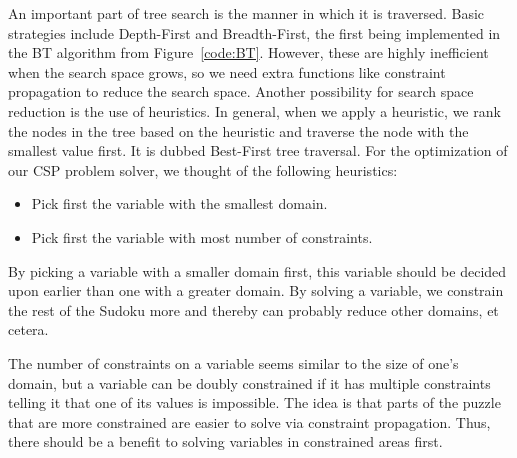 \documentclass[11pt]{article} %
\begin{document}
An important part of tree search is the manner in which it is traversed. Basic strategies include Depth-First and Breadth-First, the first being implemented in the BT algorithm from Figure~\ref{code:BT}. However, these are highly inefficient when the search space grows, so we need extra functions like constraint propagation to reduce the search space. Another possibility for search space reduction is the use of heuristics.
In general, when we apply a heuristic, we rank the nodes in the tree based on the heuristic and traverse the node with the smallest value first. It is dubbed Best-First tree traversal. For the optimization of our CSP problem solver, we thought of the following heuristics:

\begin{itemize}
\item Pick first the variable with the smallest domain.
\item Pick first the variable with most number of constraints.
\end{itemize}

By picking a variable with a smaller domain first, this variable should be decided upon earlier than one with a greater domain. By solving a variable, we constrain the rest of the Sudoku more and thereby can probably reduce other domains, et cetera.

The number of constraints on a variable seems similar to the size of one's domain, but a variable can be doubly constrained if it has multiple constraints telling it that one of its values is impossible. The idea is that parts of the puzzle that are more constrained are easier to solve via constraint propagation. Thus, there should be a benefit to solving variables in constrained areas first.
\end{document}
